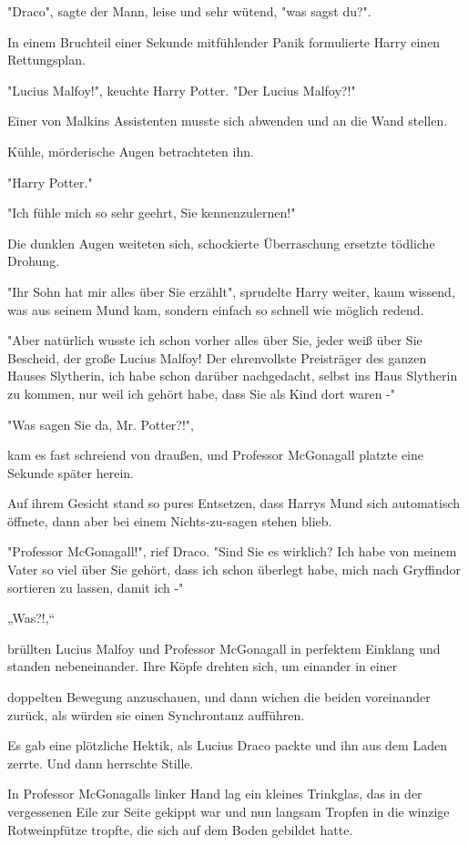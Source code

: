 {"Draco", sagte der Mann, leise und sehr wütend, "was sagst du?".

In einem Bruchteil einer Sekunde mitfühlender Panik formulierte Harry einen Rettungsplan.

"Lucius Malfoy!", keuchte Harry Potter. "Der Lucius Malfoy?!"

Einer von Malkins Assistenten musste sich abwenden und an die Wand stellen.

Kühle, mörderische Augen betrachteten ihn.

"Harry Potter."

"Ich fühle mich so sehr geehrt, Sie kennenzulernen!"

Die dunklen Augen weiteten sich, schockierte Überraschung ersetzte tödliche Drohung.

"Ihr Sohn hat mir alles über Sie erzählt", sprudelte Harry weiter, kaum wissend, was aus seinem Mund kam, sondern einfach so schnell wie möglich redend.

"Aber natürlich wusste ich schon vorher alles über Sie, jeder weiß über Sie Bescheid, der große Lucius Malfoy! Der ehrenvollste Preisträger des ganzen Hauses Slytherin, ich habe schon darüber nachgedacht, selbst ins Haus Slytherin zu kommen, nur weil ich gehört habe, dass Sie als Kind dort waren -"

"Was sagen Sie da, Mr. Potter?!",

kam es fast schreiend von draußen, und Professor McGonagall platzte eine Sekunde später herein.

Auf ihrem Gesicht stand so pures Entsetzen, dass Harrys Mund sich automatisch öffnete, dann aber bei einem Nichts-zu-sagen stehen blieb.

"Professor McGonagall!", rief Draco. "Sind Sie es wirklich? Ich habe von meinem Vater so viel über Sie gehört, dass ich schon überlegt habe, mich nach Gryffindor sortieren zu lassen, damit ich -"

„Was?!,“

brüllten Lucius Malfoy und Professor McGonagall in perfektem Einklang und standen nebeneinander. Ihre Köpfe drehten sich, um einander in einer

doppelten Bewegung anzuschauen, und dann wichen die beiden voreinander zurück, als würden sie einen Synchrontanz aufführen.

Es gab eine plötzliche Hektik, als Lucius Draco packte und ihn aus dem Laden zerrte. Und dann herrschte Stille.

In Professor McGonagalls linker Hand lag ein kleines Trinkglas, das in der vergessenen Eile zur Seite gekippt war und nun langsam Tropfen in die winzige Rotweinpfütze tropfte, die sich auf dem Boden gebildet hatte.

}
